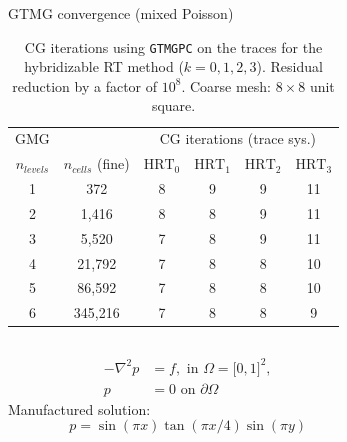 \documentclass[9pt]{beamer}
\begin{document}
\begin{frame}[c]{GTMG convergence (mixed Poisson)}
	\begin{center}
		\begin{table}
			\caption{CG iterations using
				\texttt{GTMGPC} on the traces
				for the hybridizable RT method ($k=0, 1, 2, 3$).
				Residual
				reduction by a factor of $10^8$. Coarse mesh: $8\times 8$ unit square.}
			\vspace{-10pt}\begin{tabular}{||c| c c c c c||} 
				\hline
				GMG & & \multicolumn{4}{c||}{CG iterations (trace sys.)} \\
				$n_{levels}$ & $n_{cells}$ (fine) &
				$\mathrm{HRT}_0$ & $\mathrm{HRT}_1$
				& $\mathrm{HRT}_2$
				& $\mathrm{HRT}_3$ \\ [0.5ex] 
				\hline\hline
				1 & 372     & 8 & 9 & 9 & 11\\ 
				\hline
				2 & 1,416   & 8 & 8 & 9 & 11\\
				\hline
				3 & 5,520   & 7 & 8 & 9 & 11\\
				\hline
				4 & 21,792  & 7 & 8 & 8 & 10\\
				\hline
				5 & 86,592  & 7 & 8 & 8 & 10\\
				\hline
				6 & 345,216 & 7 & 8 & 8 & 9\\ [1ex] 
				\hline
			\end{tabular}
		\end{table}
	\end{center}
	\vspace{-5pt}\begin{columns}
	\begin{column}{0.5\textwidth}
		\begin{tcolorbox}[colback=blue!5!white,colframe=mDarkTeal,title=Poisson example]
		\vspace{-15pt}\begin{align*}
		-\nabla^2 p &= f, \text{ in } \Omega = \lbrack 0, 1 \rbrack^2,\\
		p &= 0 \text{ on } \partial\Omega
		\end{align*}
		Manufactured solution:
		\vspace{-5pt}\begin{equation*}
			p = \sin(\pi x)\tan(\pi x/4)\sin(\pi y)
		\end{equation*}
	\end{tcolorbox}	
	\end{column}
	\begin{column}{0.5\textwidth}
		\vspace{-5pt}\begin{center}

\end{center}
\end{column}
\end{columns}
\end{frame}
\end{document}

